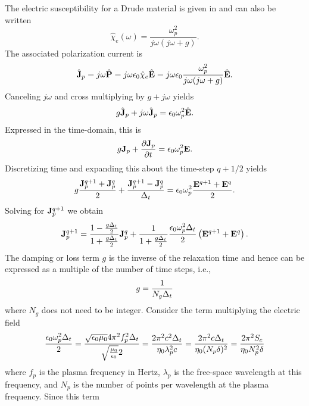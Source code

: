 The electric susceptibility for a Drude material is given in
 and can also be written
\begin{equation}
  \hat{\chi}_e(\omega) =  \frac{\omega^2_p}{j\omega(j\omega + g)}.
\end{equation}
The associated polarization current is
\begin{equation}
  \hat{\mathbf{J}}_p = j\omega\hat{\mathbf{P}} = j\omega\epsilon_0\hat{\chi}_e\hat{\mathbf{E}} = 
  j\omega\epsilon_0\frac{\omega_p^2}{j\omega(j\omega + g)}\hat{\mathbf{E}}.
\end{equation}
Canceling $j\omega$ and cross multiplying by $g+j\omega$ yields
\begin{equation}
g\hat{\mathbf{J}}_p + j\omega\hat{\mathbf{J}}_p = \epsilon_0\omega_p^2\hat{\mathbf{E}}.
\end{equation}
Expressed in the time-domain, this is
\begin{equation}
  g\mathbf{J}_p + \frac{\partial\mathbf{J}_p}{\partial t} =
  \epsilon_0\omega_p^2\mathbf{E}.
\end{equation}
Discretizing time and expanding this about the time-step $q+1/2$
yields
\begin{equation}
  g\frac{\mathbf{J}_p^{q+1} +\mathbf{J}_p^q}{2}+ \frac{\mathbf{J}_p^{q+1}-\mathbf{J}_p^q}{\Delta_t} =
  \epsilon_0\omega_p^2\frac{\mathbf{E}^{q+1}+\mathbf{E}^q}{2}.
\end{equation}
Solving for $\mathbf{J}_p^{q+1}$ we obtain
\begin{equation}
  \mathbf{J}_p^{q+1} = \frac{1-\frac{g\Delta_t}{2}}{1+\frac{g\Delta_t}{2}}\mathbf{J}_p^q
  +\frac{1}{1+\frac{g\Delta_t}{2}}
   \frac{\epsilon_0\omega_p^2\Delta_t}{2}\left(\mathbf{E}^{q+1}+\mathbf{E}^q\right).
  \label{eq:jpUpdateDrude}
\end{equation}
The damping or loss term $g$ is the inverse of the relaxation time and
hence can be expressed as a multiple of the number of time steps,
i.e.,
\begin{equation}
  g = \frac{1}{N_g\Delta_t}
\end{equation}
where $N_g$ does not need to be integer.  Consider the term
multiplying the electric field
\begin{equation}
  \frac{\epsilon_0\omega_p^2\Delta_t}{2} = 
  \frac{\sqrt{\epsilon_0\mu_0}4 \pi^2 f_p^2 \Delta_t}
       {\sqrt{\frac{\mu_0}{\epsilon_0}}2} = 
  \frac{2\pi^2 c^2 \Delta_t}{\eta_0\lambda_p^2c} = 
  \frac{2\pi^2 c \Delta_t}{\eta_0(N_p\delta)^2} = 
  \frac{2\pi^2 S_c}{\eta_0 N_p^2 \delta}
\end{equation}
where $f_p$ is the plasma frequency in Hertz, $\lambda_p$ is the
free-space wavelength at this frequency, and $N_p$ is the number of
points per wavelength at the plasma frequency.  Since this term
